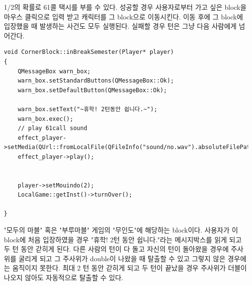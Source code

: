 \documentclass[10pt,oneside,a4paper,titlepage]{article}
\begin{document}
1/2의 확률로 61콜 택시를 부를 수 있다. 성공할 경우 사용자로부터 가고 싶은 block을 마우스 클릭으로 입력 받고 캐릭터를 그 block으로 이동시킨다. 이동 후에 그 block에 입장했을 때 발생하는 사건도 모두 실행된다. 실패할 경우 턴은 그냥 다음 사람에게 넘어간다.\\

\begin{lstlisting}[escapeinside=~~]
void CornerBlock::inBreakSemester(Player* player)
{
    QMessageBox warn_box;
    warn_box.setStandardButtons(QMessageBox::Ok);
    warn_box.setDefaultButton(QMessageBox::Ok);

    warn_box.setText("~휴학! 2턴동안 쉽니다.~");
    warn_box.exec();
    // play 61call sound
    effect_player->setMedia(QUrl::fromLocalFile(QFileInfo("sound/no.wav").absoluteFilePath()));
    effect_player->play();


    player->setMouindo(2);
    LocalGame::getInst()->turnOver();

}
\end{lstlisting}
"모두의 마블" 혹은 "부루마블" 게임의 "무인도"에 해당하는 block이다. 사용자가 이 block에 처음 입장하였을 경우 "휴학! 2턴 동안 쉽니다."라는 메시지박스를 읽게 되고 두 턴 동안 갇히게 된다. 다른 사람의 턴이 다 돌고 자신의 턴이 돌아왔을 경우에 주사위를 굴리게 되고 그 주사위가 double이 나왔을 때 탈출할 수 있고 그렇지 않은 경우에는 움직이지 못한다. 최대 2 턴 동안 갇히게 되고 두 턴이 끝났을 경우 주사위가 더블이 나오지 않아도 자동적으로 탈출할 수 있다.\\
\end{document}
